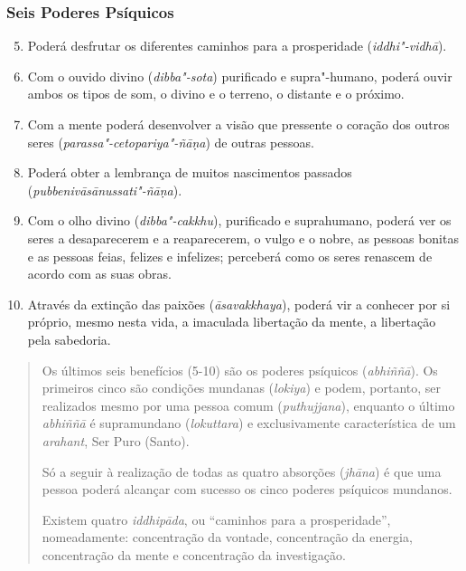 \clearpage

\subsubsection{Seis Poderes Psíquicos}


\begin{enumerate}
  \setcounter{enumi}{4}
  \item Poderá desfrutar os diferentes caminhos para a prosperidade (\emph{iddhi"-vidhā}).

  \item Com o ouvido divino (\emph{dibba"-sota}) purificado e supra"-humano,
        poderá ouvir ambos os tipos de som, o divino e o terreno, o distante e o
        próximo.

  \item Com a mente poderá desenvolver a visão que pressente o coração dos
        outros seres (\emph{parassa"-cetopariya"-ñāṇa}) de outras pessoas.

  \item Poderá obter a lembrança de muitos nascimentos passados
        (\emph{pubbenivāsānussati"-ñāṇa}).

  \item Com o olho divino (\emph{dibba"-cakkhu}), purificado e suprahumano,
        poderá ver os seres a desaparecerem e a reaparecerem, o vulgo e o nobre,
        as pessoas bonitas e as pessoas feias, felizes e infelizes; perceberá
        como os seres renascem de acordo com as suas obras.

  \item Através da extinção das paixões (\emph{āsavakkhaya}), poderá vir a
        conhecer por si próprio, mesmo nesta vida, a imaculada libertação da
        mente, a libertação pela sabedoria.
\end{enumerate}


\begin{quote}
  Os últimos seis benefícios (5-10) são os poderes psíquicos (\emph{abhiññā}).
  Os primeiros cinco são condições mundanas (\emph{lokiya}) e podem, portanto,
  ser realizados mesmo por uma pessoa comum (\emph{puthujjana}), enquanto o
  último \emph{abhiññā} é supramundano (\emph{lokuttara}) e exclusivamente
  característica de um \emph{arahant}, Ser Puro (Santo).

  Só a seguir à realização de todas as quatro absorções (\emph{jhāna}) é que uma
  pessoa poderá alcançar com sucesso os cinco poderes psíquicos mundanos.

  Existem quatro \emph{iddhipāda}, ou “caminhos para a prosperidade”,
  nomeadamente: concentração da vontade, concentração da energia, concentração
  da mente e concentração da investigação.
\end{quote}

